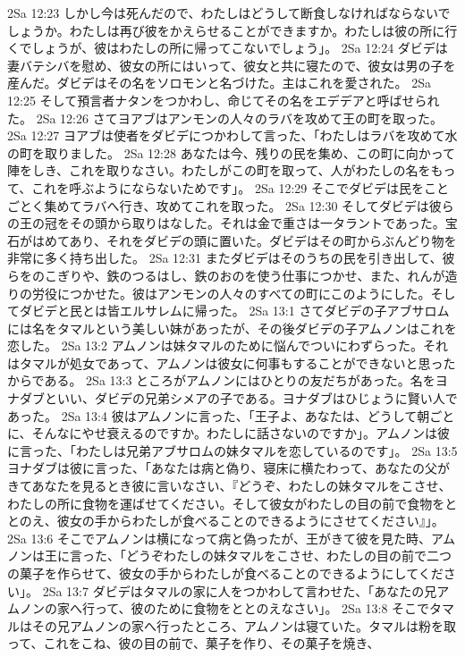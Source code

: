 2Sa 12:23  しかし今は死んだので、わたしはどうして断食しなければならないでしょうか。わたしは再び彼をかえらせることができますか。わたしは彼の所に行くでしょうが、彼はわたしの所に帰ってこないでしょう」。
2Sa 12:24  ダビデは妻バテシバを慰め、彼女の所にはいって、彼女と共に寝たので、彼女は男の子を産んだ。ダビデはその名をソロモンと名づけた。主はこれを愛された。
2Sa 12:25  そして預言者ナタンをつかわし、命じてその名をエデデアと呼ばせられた。
2Sa 12:26  さてヨアブはアンモンの人々のラバを攻めて王の町を取った。
2Sa 12:27  ヨアブは使者をダビデにつかわして言った、「わたしはラバを攻めて水の町を取りました。
2Sa 12:28  あなたは今、残りの民を集め、この町に向かって陣をしき、これを取りなさい。わたしがこの町を取って、人がわたしの名をもって、これを呼ぶようにならないためです」。
2Sa 12:29  そこでダビデは民をことごとく集めてラバへ行き、攻めてこれを取った。
2Sa 12:30  そしてダビデは彼らの王の冠をその頭から取りはなした。それは金で重さは一タラントであった。宝石がはめてあり、それをダビデの頭に置いた。ダビデはその町からぶんどり物を非常に多く持ち出した。
2Sa 12:31  またダビデはそのうちの民を引き出して、彼らをのこぎりや、鉄のつるはし、鉄のおのを使う仕事につかせ、また、れんが造りの労役につかせた。彼はアンモンの人々のすべての町にこのようにした。そしてダビデと民とは皆エルサレムに帰った。
2Sa 13:1  さてダビデの子アブサロムには名をタマルという美しい妹があったが、その後ダビデの子アムノンはこれを恋した。
2Sa 13:2  アムノンは妹タマルのために悩んでついにわずらった。それはタマルが処女であって、アムノンは彼女に何事もすることができないと思ったからである。
2Sa 13:3  ところがアムノンにはひとりの友だちがあった。名をヨナダブといい、ダビデの兄弟シメアの子である。ヨナダブはひじょうに賢い人であった。
2Sa 13:4  彼はアムノンに言った、「王子よ、あなたは、どうして朝ごとに、そんなにやせ衰えるのですか。わたしに話さないのですか」。アムノンは彼に言った、「わたしは兄弟アブサロムの妹タマルを恋しているのです」。
2Sa 13:5  ヨナダブは彼に言った、「あなたは病と偽り、寝床に横たわって、あなたの父がきてあなたを見るとき彼に言いなさい、『どうぞ、わたしの妹タマルをこさせ、わたしの所に食物を運ばせてください。そして彼女がわたしの目の前で食物をととのえ、彼女の手からわたしが食べることのできるようにさせてください』」。
2Sa 13:6  そこでアムノンは横になって病と偽ったが、王がきて彼を見た時、アムノンは王に言った、「どうぞわたしの妹タマルをこさせ、わたしの目の前で二つの菓子を作らせて、彼女の手からわたしが食べることのできるようにしてください」。
2Sa 13:7  ダビデはタマルの家に人をつかわして言わせた、「あなたの兄アムノンの家へ行って、彼のために食物をととのえなさい」。
2Sa 13:8  そこでタマルはその兄アムノンの家へ行ったところ、アムノンは寝ていた。タマルは粉を取って、これをこね、彼の目の前で、菓子を作り、その菓子を焼き、
